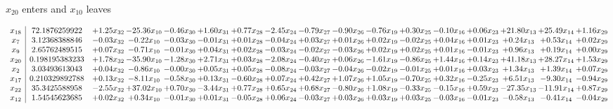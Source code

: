 \documentclass[9pt]{article}
\begin{document}
 $ x_{20} $ enters and $ x_{10} $ leaves 

 \[\begin{array}{c| c c@{\hskip 2pt} c@{\hskip 2pt} c@{\hskip 2pt} c@{\hskip 2pt} c@{\hskip 2pt} c@{\hskip 2pt} c@{\hskip 2pt} c@{\hskip 2pt} c@{\hskip 2pt} c@{\hskip 2pt} c@{\hskip 2pt} c@{\hskip 2pt} c@{\hskip 2pt} c@{\hskip 2pt} c@{\hskip 2pt} }
 x_{18}   &  72.1876259922 & +  1.25 x_{32} & -25.36 x_{10} & -0.46 x_{30} & +  1.60 x_{31} & +  0.77 x_{28} & -2.45 x_{24} & -0.79 x_{27} & -0.90 x_{26} & -0.76 x_{19} & +  0.30 x_{25} & -0.10 x_{16} & +  0.06 x_{23} & + 21.80 x_{13} & + 25.49 x_{14} & +  1.16 x_{29}\\
 x_{7}   &  3.12368388846 & -0.03 x_{32} & -0.22 x_{10} & -0.03 x_{30} & -0.01 x_{31} & +  0.01 x_{28} & -0.04 x_{24} & +  0.03 x_{27} & +  0.01 x_{26} & +  0.02 x_{19} & -0.02 x_{25} & +  0.04 x_{16} & +  0.01 x_{23} & +  0.24 x_{13} & +  0.53 x_{14} & +  0.02 x_{29}\\
 x_{9}   &  2.65762489515 & +  0.07 x_{32} & -0.71 x_{10} & -0.01 x_{30} & +  0.04 x_{31} & +  0.02 x_{28} & -0.03 x_{24} & -0.02 x_{27} & -0.03 x_{26} & +  0.02 x_{19} & +  0.02 x_{25} & +  0.01 x_{16} & -0.01 x_{23} & +  0.96 x_{13} & +  0.19 x_{14} & +  0.00 x_{29}\\
 x_{20}   &  0.198195383233 & +  1.78 x_{32} & -35.90 x_{10} & -1.28 x_{30} & +  2.71 x_{31} & +  0.03 x_{28} & -2.08 x_{24} & -0.40 x_{27} & +  0.06 x_{26} & -1.61 x_{19} & -0.86 x_{25} & +  1.44 x_{16} & +  0.14 x_{23} & + 41.18 x_{13} & + 28.27 x_{14} & +  1.53 x_{29}\\
 x_{2}   &  3.03493613043 & +  0.04 x_{32} & -0.86 x_{10} & -0.00 x_{30} & +  0.05 x_{31} & +  0.05 x_{28} & -0.08 x_{24} & -0.03 x_{27} & -0.04 x_{26} & -0.02 x_{19} & -0.01 x_{25} & +  0.01 x_{16} & +  0.03 x_{23} & +  1.34 x_{13} & +  1.39 x_{14} & +  0.07 x_{29}\\
 x_{17}   &  0.210329892788 & +  0.13 x_{32} & -8.11 x_{10} & -0.58 x_{30} & +  0.13 x_{31} & -0.60 x_{28} & +  0.07 x_{24} & +  0.42 x_{27} & +  1.07 x_{26} & +  1.05 x_{19} & -0.70 x_{25} & +  0.32 x_{16} & -0.25 x_{23} & +  6.51 x_{13} & -9.30 x_{14} & -0.94 x_{29}\\
 x_{22}   &  35.3425588958 & -2.55 x_{32} & + 37.02 x_{10} & +  0.70 x_{30} & -3.44 x_{31} & +  0.77 x_{28} & +  0.65 x_{24} & +  0.68 x_{27} & -0.80 x_{26} & +  1.08 x_{19} & -0.33 x_{25} & -0.15 x_{16} & +  0.59 x_{23} & -27.35 x_{13} & -11.91 x_{14} & +  0.87 x_{29}\\
 x_{12}   &  1.54545623685 & +  0.02 x_{32} & +  0.34 x_{10} & -0.01 x_{30} & +  0.01 x_{31} & -0.05 x_{28} & +  0.06 x_{24} & -0.03 x_{27} & +  0.03 x_{26} & +  0.03 x_{19} & +  0.03 x_{25} & -0.03 x_{16} & -0.01 x_{23} & -0.58 x_{13} & -0.41 x_{14} & -0.04 x_{29}\\

\end{array}\]
\end{document}
